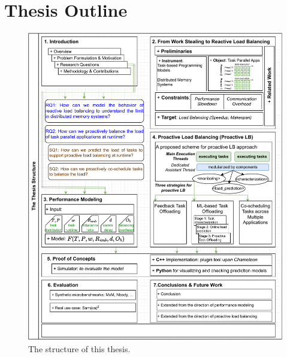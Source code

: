 \section{Thesis Outline}
\label{sec:intro_outline}

\begin{figure}[t]
	\centering
	\includegraphics[scale=0.8]{./pictures/introduction/intro_thesis_outline.pdf}
	\caption{The structure of this thesis.}
	\label{fig:intro_outline}
\end{figure}

